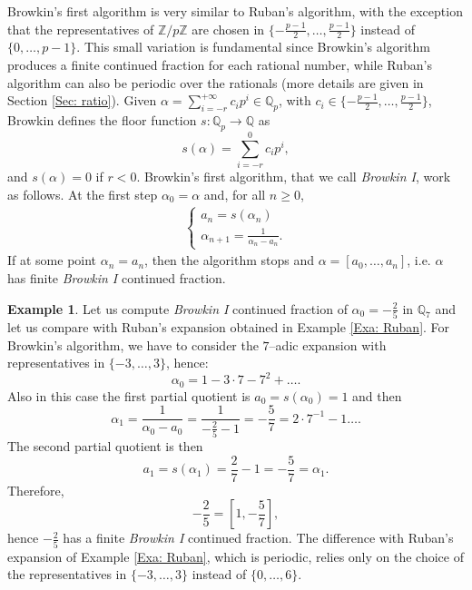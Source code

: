 \documentclass[12pt, reqno]{amsart}
\theoremstyle{plain}
\theoremstyle{definition}
\newtheorem{Example}[Theorem]{Example}
\begin{document}
Browkin's first algorithm  \cite{BI} is very similar to Ruban's algorithm, with the exception that the representatives of $\mathbb{Z}/p\mathbb{Z}$ are chosen in $\{-\frac{p-1}{2},\ldots,\frac{p-1}{2}\}$ instead of $\{0,\ldots,p-1\}$. This small variation is fundamental since Browkin's algorithm produces a finite continued fraction for each rational number, while Ruban's algorithm can also be periodic over the rationals (more details are given in Section \ref{Sec: ratio}). Given $\alpha=\sum\limits_{i=-r}^{+\infty}c_ip^i\in\mathbb{Q}_p$, with $c_i \in \{ -\frac{p-1}{2}, \ldots, \frac{p-1}{2} \}$, Browkin defines the floor function $s:\mathbb{Q}_p\rightarrow \mathbb{Q}$ as
\begin{equation}\label{Eq: sfunc}
s(\alpha)=\sum\limits_{i=-r}^{0}c_ip^i,
\end{equation}
and $s(\alpha)=0$ if $r<0$. Browkin's first algorithm, that we call \textit{Browkin I}, work as follows. At the first step $\alpha_{0}=\alpha$ and, for all $n\geq 0$,
\begin{align} 
\begin{cases}\label{Alg: Br1}
a_n=s(\alpha_n)\\
\alpha_{n+1}=\frac{1}{\alpha_n-a_n}.
\end{cases}
\end{align}
If at some point $\alpha_n=a_n$, then the algorithm stops and $\alpha=[a_0,\ldots,a_n]$, i.e. $\alpha$ has finite \textit{Browkin I} continued fraction. 

\begin{Example}
Let us compute \textit{Browkin I} continued fraction of $\alpha_0=-\frac{2}{5}$ in $\mathbb{Q}_7$ and let us compare with Ruban's expansion obtained in Example \ref{Exa: Ruban}. For Browkin's algorithm, we have to consider the $7$--adic expansion with representatives in $\{-3,\ldots,3\}$, hence:
\[\alpha_0 = 1 -3 \cdot 7 -  7^2 + \ldots.\]
Also in this case the first partial quotient is $a_0= s(\alpha_0 )= 1$ and then
\[\alpha_1 =\frac{1}{\alpha_0-a_0}=\frac{1}{-\frac{2}{5}-1}= -\frac{5}{7} = 2 \cdot 7^{-1} -1 \ldots.\]
The second partial quotient is then
\[a_1=s(\alpha_1)=\frac{2}{7}-1=-\frac{5}{7}=\alpha_1.\]
Therefore,
\[-\frac{2}{5}=\left[1,-\frac{5}{7}\right],\]
hence $-\frac{2}{5}$ has a finite \textit{Browkin I} continued fraction. The difference with Ruban's expansion of Example \ref{Exa: Ruban}, which is periodic, relies only on the choice of the representatives in $\{-3,\ldots,3\}$ instead of $\{0,\ldots,6\}$.
\end{Example}
\end{document}
